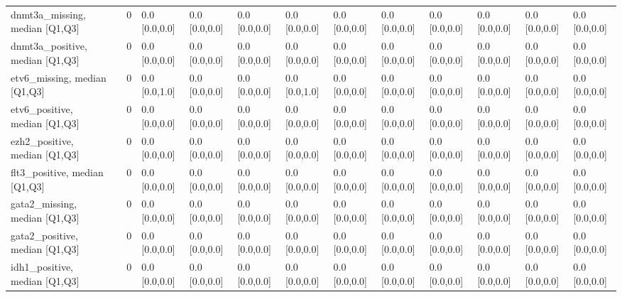 \begin{tabular}{lllllllllllll}
dnmt3a\_missing, median [Q1,Q3] &    &                    0 &       0.0 [0.0,0.0] &      0.0 [0.0,0.0] &        0.0 [0.0,0.0] &       0.0 [0.0,0.0] &     0.0 [0.0,0.0] &     0.0 [0.0,0.0] &     0.0 [0.0,0.0] &        0.0 [0.0,0.0] &       0.0 [0.0,0.0] &        0.0 [0.0,0.0] \\
dnmt3a\_positive, median [Q1,Q3] &    &                    0 &       0.0 [0.0,0.0] &      0.0 [0.0,0.0] &        0.0 [0.0,0.0] &       0.0 [0.0,0.0] &     0.0 [0.0,0.0] &     0.0 [0.0,0.0] &     0.0 [0.0,0.0] &        0.0 [0.0,0.0] &       0.0 [0.0,0.0] &        0.0 [0.0,0.0] \\
etv6\_missing, median [Q1,Q3] &    &                    0 &       0.0 [0.0,1.0] &      0.0 [0.0,0.0] &        0.0 [0.0,0.0] &       0.0 [0.0,1.0] &     0.0 [0.0,0.0] &     0.0 [0.0,0.0] &     0.0 [0.0,0.0] &        0.0 [0.0,0.0] &       0.0 [0.0,0.0] &        0.0 [0.0,0.0] \\
etv6\_positive, median [Q1,Q3] &    &                    0 &       0.0 [0.0,0.0] &      0.0 [0.0,0.0] &        0.0 [0.0,0.0] &       0.0 [0.0,0.0] &     0.0 [0.0,0.0] &     0.0 [0.0,0.0] &     0.0 [0.0,0.0] &        0.0 [0.0,0.0] &       0.0 [0.0,0.0] &        0.0 [0.0,0.0] \\
ezh2\_positive, median [Q1,Q3] &    &                    0 &       0.0 [0.0,0.0] &      0.0 [0.0,0.0] &        0.0 [0.0,0.0] &       0.0 [0.0,0.0] &     0.0 [0.0,0.0] &     0.0 [0.0,0.0] &     0.0 [0.0,0.0] &        0.0 [0.0,0.0] &       0.0 [0.0,0.0] &        0.0 [0.0,0.0] \\
flt3\_positive, median [Q1,Q3] &    &                    0 &       0.0 [0.0,0.0] &      0.0 [0.0,0.0] &        0.0 [0.0,0.0] &       0.0 [0.0,0.0] &     0.0 [0.0,0.0] &     0.0 [0.0,0.0] &     0.0 [0.0,0.0] &        0.0 [0.0,0.0] &       0.0 [0.0,0.0] &        0.0 [0.0,0.0] \\
gata2\_missing, median [Q1,Q3] &    &                    0 &       0.0 [0.0,0.0] &      0.0 [0.0,0.0] &        0.0 [0.0,0.0] &       0.0 [0.0,0.0] &     0.0 [0.0,0.0] &     0.0 [0.0,0.0] &     0.0 [0.0,0.0] &        0.0 [0.0,0.0] &       0.0 [0.0,0.0] &        0.0 [0.0,0.0] \\
gata2\_positive, median [Q1,Q3] &    &                    0 &       0.0 [0.0,0.0] &      0.0 [0.0,0.0] &        0.0 [0.0,0.0] &       0.0 [0.0,0.0] &     0.0 [0.0,0.0] &     0.0 [0.0,0.0] &     0.0 [0.0,0.0] &        0.0 [0.0,0.0] &       0.0 [0.0,0.0] &        0.0 [0.0,0.0] \\
idh1\_positive, median [Q1,Q3] &    &                    0 &       0.0 [0.0,0.0] &      0.0 [0.0,0.0] &        0.0 [0.0,0.0] &       0.0 [0.0,0.0] &     0.0 [0.0,0.0] &     0.0 [0.0,0.0] &     0.0 [0.0,0.0] &        0.0 [0.0,0.0] &       0.0 [0.0,0.0] &        0.0 [0.0,0.0] \\

\end{tabular}
